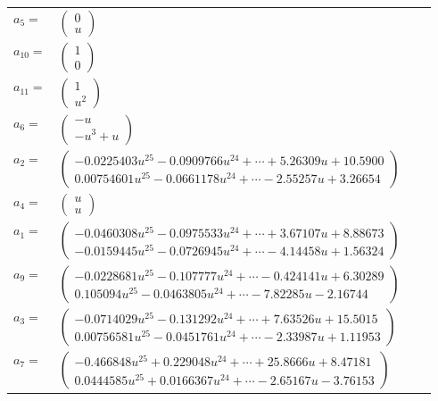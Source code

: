 \documentclass[1p]{elsarticle_modified}
\theoremstyle{definition}
\begin{document}
\begin{tabular}{m{7pt} m{180pt} m{7pt} m{180pt} }
\flushright $a_{5}=$&$\begin{pmatrix}0\\u\end{pmatrix}$ \\
\flushright $a_{10}=$&$\begin{pmatrix}1\\0\end{pmatrix}$ \\
\flushright $a_{11}=$&$\begin{pmatrix}1\\u^2\end{pmatrix}$ \\
\flushright $a_{6}=$&$\begin{pmatrix}- u\\- u^3+u\end{pmatrix}$ \\
\flushright $a_{2}=$&$\begin{pmatrix}-0.0225403 u^{25}-0.0909766 u^{24}+\cdots+5.26309 u+10.5900\\0.00754601 u^{25}-0.0661178 u^{24}+\cdots-2.55257 u+3.26654\end{pmatrix}$ \\
\flushright $a_{4}=$&$\begin{pmatrix}u\\u\end{pmatrix}$ \\
\flushright $a_{1}=$&$\begin{pmatrix}-0.0460308 u^{25}-0.0975533 u^{24}+\cdots+3.67107 u+8.88673\\-0.0159445 u^{25}-0.0726945 u^{24}+\cdots-4.14458 u+1.56324\end{pmatrix}$ \\
\flushright $a_{9}=$&$\begin{pmatrix}-0.0228681 u^{25}-0.107777 u^{24}+\cdots-0.424141 u+6.30289\\0.105094 u^{25}-0.0463805 u^{24}+\cdots-7.82285 u-2.16744\end{pmatrix}$ \\
\flushright $a_{3}=$&$\begin{pmatrix}-0.0714029 u^{25}-0.131292 u^{24}+\cdots+7.63526 u+15.5015\\0.00756581 u^{25}-0.0451761 u^{24}+\cdots-2.33987 u+1.11953\end{pmatrix}$ \\
\flushright $a_{7}=$&$\begin{pmatrix}-0.466848 u^{25}+0.229048 u^{24}+\cdots+25.8666 u+8.47181\\0.0444585 u^{25}+0.0166367 u^{24}+\cdots-2.65167 u-3.76153\end{pmatrix}$ \\

\end{tabular}
\end{document}
